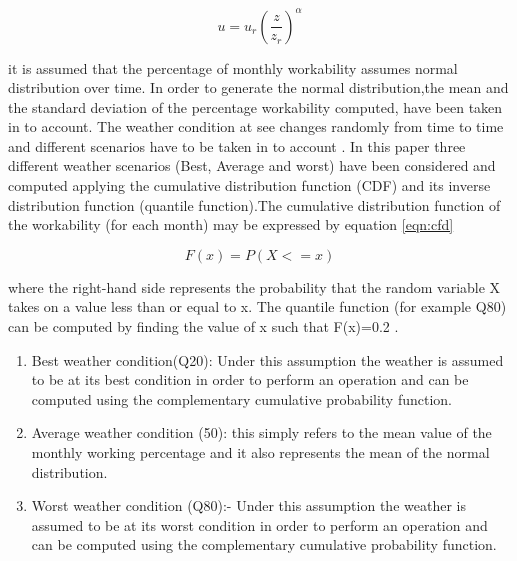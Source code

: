\begin{equation}
\label{eqn:windprofile}
u = u_{r} \left( \frac{z}{z_r} \right)^{\alpha}
\end{equation}

it is assumed that the percentage of monthly workability assumes normal distribution over time. In order to  generate the normal distribution,the mean and the standard deviation of the percentage workability computed, have been taken in to account. The weather condition at see changes randomly from time to time and different scenarios have to be taken in to account . In this paper three different weather scenarios (Best, Average and worst) have been considered and computed applying the cumulative distribution function (CDF) and its inverse distribution function (quantile function).The cumulative distribution function of the workability (for each month) may be expressed by equation \ref{eqn:cfd}

\begin{equation}
\label{eqn:cfd}
F\left(x \right) =P\left(X<=x\right)

\end{equation}


 where the right-hand side represents the probability that the random variable X takes on a value less than or equal to x. The quantile function (for example Q80) can be computed by finding the value of x such that F(x)=0.2 .  

\begin{enumerate}[label=\roman*]
\item
Best weather condition(Q20): Under this assumption the weather is assumed to be at its best condition in order to perform an operation and can be computed using the complementary cumulative probability function. 
\item
Average weather condition (50): this simply refers to the mean value of the monthly working percentage and it also represents  the mean of the normal distribution.
\item Worst weather condition (Q80):- Under this assumption the weather is assumed to be at its worst condition in order to perform an operation and can be computed using the complementary cumulative probability function. 
\end{enumerate}

